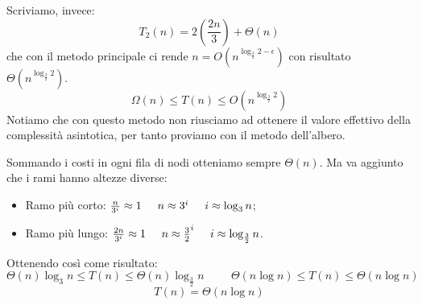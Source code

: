 \begin{exercise}
    Scriviamo, invece:
    \begin{equation*}
        T_2(n)=2(\frac{2n}{3})+\Theta(n)
    \end{equation*}
    che con il metodo principale ci rende $n=O(n^{\log_\frac{3}{2}2-\epsilon})$ con risultato $\Theta(n^{\log_\frac{3}{2}2})$.
     \begin{equation*}
         \Omega(n)\leq T(n)\leq O(n^{\log_\frac{3}{2}2})
     \end{equation*}
     Notiamo che con questo metodo non riusciamo ad ottenere il valore effettivo della complessità asintotica, per tanto proviamo con il metodo dell'albero.
     \begin{center}
     \end{center}
     Sommando i costi in ogni fila di nodi otteniamo sempre $\Theta(n)$. Ma va aggiunto che i rami hanno altezze diverse:
     \begin{itemize}
         \item[] Ramo più corto: $\frac{n}{3^i}\approx1\hspace{0.5cm}n\approx3^i\hspace{0.5cm}i\approx\log_3n$;
         \item[] Ramo più lungo: $\frac{2n}{3^i}\approx1\hspace{0.5cm}n\approx\frac{3}{2}^i\hspace{0.5cm}i\approx\log_\frac{3}{2}n$.
     \end{itemize}
     Ottenendo così come risultato:\begin{equation*}\Theta(n)\log_3n\leq T(n)\leq \Theta(n)\log_\frac{3}{2}n\hspace{1cm}\Theta(n\log n)\leq T(n)\leq \Theta(n\log n)\end{equation*}\begin{equation*}T(n)=\Theta(n\log n)\end{equation*}
 \end{exercise}